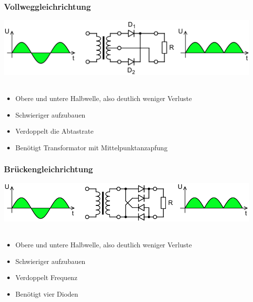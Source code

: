 \begin{frame}
    \frametitle{Vollweggleichrichtung}
    \begin{center}
        \includegraphics[width=1\textwidth,height=.6\textheight,keepaspectratio]{a05/Fullwave_rectifier.png}\\
        \tiny \hyperlink{refs}{\cite{wm}} \\[1em] \large
        \begin{itemize}
			\item Obere und untere Halbwelle, also deutlich weniger Verluste
			\item Schwieriger aufzubauen
			\item Verdoppelt die Abtastrate
			\item Benötigt Transformator mit Mittelpunktanzapfung
    	\end{itemize}
 	\end{center}
\end{frame}

\begin{frame}
    \frametitle{Brückengleichrichtung}
    \begin{center}
        \includegraphics[width=1\textwidth,height=.6\textheight,keepaspectratio]{a05/Gratz_rectifier.png}\\
        \tiny \hyperlink{refs}{\cite{wm}} \\[1em] \large
        \begin{itemize}
			\item Obere und untere Halbwelle, also deutlich weniger Verluste
			\item Schwieriger aufzubauen
			\item Verdoppelt Frequenz
			\item Benötigt vier Dioden
    	\end{itemize}
 	\end{center}
\end{frame}

